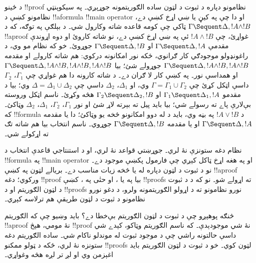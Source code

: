 \documentclass[../../../include/open-logic-section]{subfiles}
\begin{document}
د ځينو !!{proof} نظامونو دپاره د ثبوت د لټون ساده
الګوريتمونه جوړېږي۔ په سيکوېنټي نظامونو کښې د
!!a{formula} !!{main operator} او دا چې په کيڼ يا ښي اړخ
کښې دے، ټاکي چې کومه قاعده شاته وکارول شي۔ د بېلګې په
توګه، که د $\Gamma \Sequent \Delta, !A \land !B$
!!a{proof} غواړئ، چې $!A \land !B$ ئې په ښي اړخ کښې
دے، نو \RightR{\land} شاته کاروئ او دوه اړوندې مقدمې
$\Gamma \Sequent \Delta, !A$ او $\Gamma \Sequent \Delta, !B$
جوړوئ۔ خو که نظام مو  وي، د راغونډولو موجودګي
کار ګرانوي، ځکه نور امکانونه درکوي: \RightR{\Contraction}
هم شاته کارولے او مقدمه
$\Gamma \Sequent \Delta, !A \land !B, !A \land !B$
جوړولے شئ؛ بيا
$\Gamma \Sequent \Delta, !A \land !B, !A \land !B, !A \land !B$
او همداسې نور۔ په  کښې کار لا ګران دے۔ د
\RightR{\land} شاته کارونه دا هم غواړي چې $\Gamma_1$،
$\Gamma_2$ داسې اټکل کړئ چې $\Gamma = \Gamma_1 \cup \Gamma_2$
وي، او $\Delta_1$، $\Delta_2$ داسې چې
$\Delta = \Delta_1 \cup \Delta_2$ وي؛ بيا د مقدمو
$\Gamma_1 \Sequent \Delta_1, !A$ او
$\Gamma_2 \Sequent \Delta_2, !B$ هڅه وکړئ۔ ناسم اټکل
وروسته بې‌لارې پاے ته رسولے شي؛ بيا بايد پيل ته بېرته
لاړ شئ او نور $\Gamma_1$، $\Gamma_2$، $\Delta_1$،
$\Delta_2$ وټاکئ۔ که !!{formula} د $!A \lor !B$ په بڼه
وي، بايد د \RightR{\lor} له دوو امکانونو څخه يو وټاکئ؛
دا يا مقدمه $\Gamma \Sequent \Delta, !A$ او يا مقدمه
$\Gamma \Sequent \Delta, !B$ جوړوي۔ ناسم انتخاب بيا هم
شاته تګ ته اړکولے شي۔

نظام  دغه ستونزې نۀ لري۔ جوړښتي قواعد نۀ لري،
او د استنتاجي قاعدې انتخاب د !!{formula} په
!!{main operator} او په هغه اړخ ټاکل کېږي چې فارمول
پکښې موجود دے۔ نو  د ثبوت د لټون دپاره له
 يا  څخه زيات مناسب دے۔ بريالے لټون
په  کښې !!a{proof} ورکوي؛ دغه !!{proof} بيا په
 يا ، او حتٰی په ، کښې
!!{proof}s ته اړولے شو۔ نو که د  د ثبوت د
لټون الګوريتم او د  !!{proof}s نورو نظامونو ته
د اړولو الګوريتمونه ولرو، د دغو نورو نظامونو د ثبوت د
لټون طريقې هم ترلاسه کېږي۔

څنګه پوهېږو چې د ثبوت د لټون الګوريتم بې‌خطا دے؟ بايد
وښيو چې که الګوريتم !!a{proof} نۀ مومي، هېڅ !!{proof}
نۀ شي موجودېدې۔ که ناسم الګوريتم وټاکو، کېدے شي داسې
حالتونه راشي چې د موجود ثبوت له موندلو ناکام شي۔ ساده
الګوريتم دغه ستونزه نۀ لري، ځکه د ټولو ممکنو
!!{proof}s لټون کوي۔ خو د ثبوت د لټون الګوريتم بايد
اغېزمن وي او لږ تر لږه هڅه وغواړي۔
\end{document}
